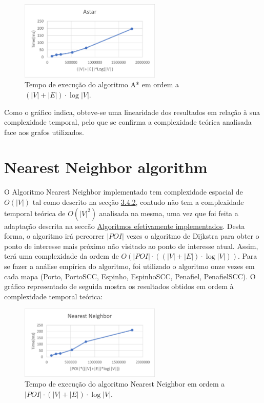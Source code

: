 \documentclass[12pt,a4paper]{report}
\begin{document}
\begin{figure}[H]
	\includegraphics[width=0.6\textwidth]{./imgs/charts/AstarTime.png}
	\centering
	\caption{Tempo de execução do algoritmo A* em ordem a $(|V|+|E|)\cdot \log |V|$.}
\end{figure}


Como o gráfico indica, obteve-se uma linearidade dos resultados em relação à sua complexidade temporal, pelo que se confirma a complexidade teórica
analisada face aos grafos utilizados.


\section{Nearest Neighbor algorithm}
O Algoritmo Nearest Neighbor implementado tem complexidade espacial de \(O(|V|)\) tal como descrito na secção \hyperref[algo:nn]{3.4.2}, contudo não tem a complexidade temporal teórica de \( O(|V|^2)\) 
analisada na mesma, uma vez que foi feita a adaptação descrita na seccão \hyperref[implementedAlgos]{Algoritmos efetivamente implementados}. Desta forma, o algoritmo 
irá percorrer \(|POI|\) vezes o algoritmo de Dijkstra para obter o ponto de interesse mais próximo não visitado ao ponto de interesse atual. Assim, terá uma complexidade 
da ordem de \( O(|POI| \cdot ((|V| + |E|)\cdot \log |V|)) \). Para se fazer a análise empírica do algoritmo, foi utilizado o algoritmo onze vezes em 
cada mapa (Porto, PortoSCC, Espinho, EspinhoSCC, Penafiel, PenafielSCC). O gráfico representado de seguida mostra os resultados obtidos em ordem à complexidade temporal teórica:

\begin{figure}[H]
	\includegraphics[width=0.6\textwidth]{./imgs/charts/NNTimeComplexity.png}
	\centering
	\caption{Tempo de execução do algoritmo Nearest Neighbor em ordem a $|POI|\cdot (|V|+|E|)\cdot \log |V|$.}
\end{figure}
\end{document}
